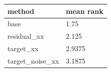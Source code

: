 \begin{tabular}{ll}
\toprule
method & mean rank \\
\midrule
base & 1.75 \\
residual\_xx & 2.125 \\
target\_xx & 2.9375 \\
target\_noise\_xx & 3.1875 \\
\bottomrule
\end{tabular}
